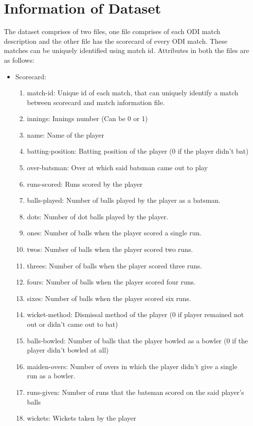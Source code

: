 \documentclass[fleqn,10pt]{wlscirep}
\begin{document}
\section{Information of Dataset}
The dataset comprises of two files, one file comprises of each ODI match description and the other file has the scorecard of every ODI match. These matches can be uniquely
identified using match id. Attributes in both the files are as follows:
\begin{itemize}
\item Scorecard:
\begin{enumerate}
\item match-id: Unique id of each match, that can uniquely identify a match between scorecard and match information file.
\item innings: Innings number (Can be 0 or 1)
\item name: Name of the player
\item batting-position: Batting position of the player (0 if the player didn't bat)
\item over-batsman: Over at which said batsman came out to play
\item runs-scored: Runs scored by the player
\item balls-played: Number of balls played by the player as a batsman.
\item dots: Number of dot balls played by the player.
\item ones: Number of balls when the player scored a single run.
\item twos: Number of balls when the player scored two runs.
\item threes: Number of balls when the player scored three runs.
\item fours: Number of balls when the player scored four runs.
\item sixes: Number of balls when the player scored six runs.
\item wicket-method: Dismissal method of the player (0 if player remained not out or didn't came out to bat)
\item balls-bowled: Number of balls that the player bowled as a bowler (0 if the player didn't bowled at all)
\item maiden-overs: Number of overs in which the player didn't give a single run as a bowler.
\item runs-given: Number of runs that the batsman scored on the said player's balls 
\item wickets: Wickets taken by the player 

\end{enumerate}
\end{itemize}
\end{document}

